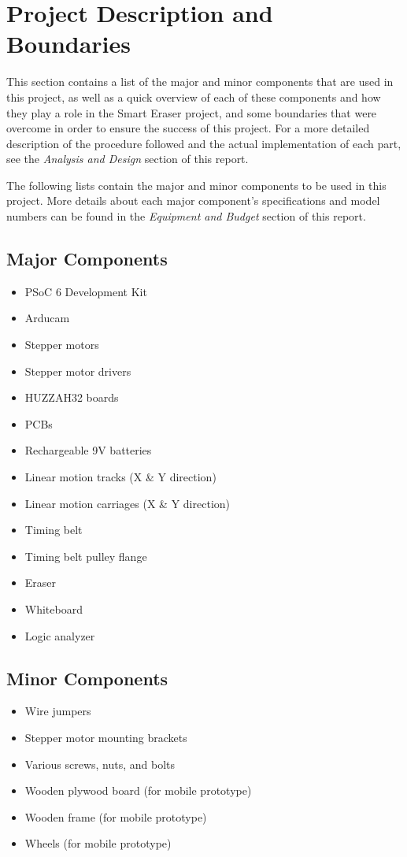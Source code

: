 \section{Project Description and Boundaries}
This section contains a list of the major and minor components that are used in this project, as well as a quick overview of each of these components and how they play a role in the Smart Eraser project, and some boundaries that were overcome in order to ensure the success of this project. For a more detailed description of the procedure followed and the actual implementation of each part, see the \textit{Analysis and Design} section of this report. \par
\setlength{\parindent}{2.5ex}The following lists contain the major and minor components to be used in this project. More details about each major component's specifications and model numbers can be found in the \textit{Equipment and Budget} section of this report.


\subsection{Major Components}
\begin{itemize}
	\item PSoC 6 Development Kit
	\item Arducam
	\item Stepper motors
	\item Stepper motor drivers
	\item HUZZAH32 boards
	\item PCBs
	\item Rechargeable 9V batteries
	\item Linear motion tracks (X \& Y direction)
	\item Linear motion carriages (X \& Y direction)
	\item Timing belt
	\item Timing belt pulley flange
	\item Eraser
	\item Whiteboard
	\item Logic analyzer
\end{itemize}

\subsection{Minor Components}
\begin{itemize}
	\item Wire jumpers
	\item Stepper motor mounting brackets
	\item Various screws, nuts, and bolts
	\item Wooden plywood board (for mobile prototype)
	\item Wooden frame (for mobile prototype)
	\item Wheels (for mobile prototype)
\end{itemize}

